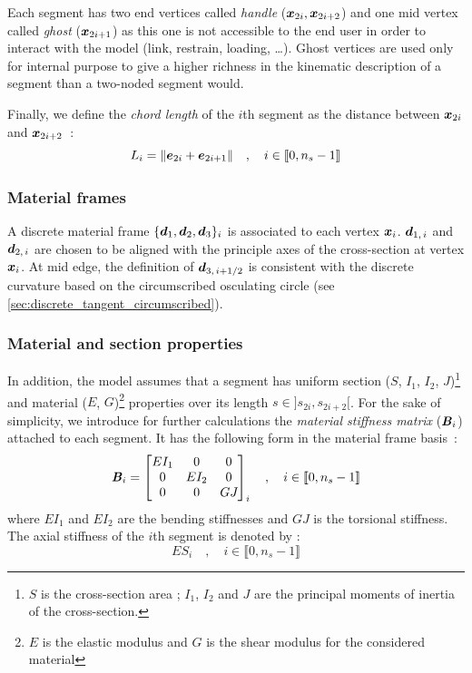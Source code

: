 Each segment has two end vertices called \emph{handle} ($\boldsymbol{x}_{2i}, \boldsymbol{x}_{2i+2}$) and one mid vertex called \emph{ghost} ($\boldsymbol{x}_{2i+1}$) as this one is not accessible to the end user in order to interact with the model (link, restrain, loading, \dots). Ghost vertices are used only for internal purpose to give a higher richness in the kinematic description of a segment than a two-noded segment would.

Finally, we define the \emph{chord length} of the $i$th segment as the distance between $\boldsymbol{x}_{2i}$ and $\boldsymbol{x}_{2i+2}$~:
\begin{equation}
	L_i = \lVert\boldsymbol{e}_{2i} + \boldsymbol{e}_{2i+1}\rVert \quad , \quad i \in \llbracket 0, n_s-1 \rrbracket
\end{equation}

\subsubsection{Material frames}
A discrete material frame $\{\boldsymbol{d}_{1}, \boldsymbol{d}_{2}, \boldsymbol{d}_{3}\}_i$ is associated to each vertex $\boldsymbol{x}_i$. $\boldsymbol{d}_{1,\,i}$ and $\boldsymbol{d}_{2,\,i}$ are chosen to be aligned with the principle axes of the cross-section at vertex $\boldsymbol{x}_i$. At mid edge, the definition of $\boldsymbol{d}_{3,\,i+1/2}$ is consistent with the discrete curvature based on the circumscribed osculating circle (see \cref{sec:discrete_tangent_circumscribed}).

\subsubsection{Material and section properties}
In addition, the model assumes that a segment has uniform section ($S$, $I_1$, $I_2$, $J$)\footnote{$S$ is the cross-section area ; $I_1$, $I_2$ and $J$ are the principal moments of inertia of the cross-section.} and material ($E$, $G$)\footnote{$E$ is the elastic modulus and $G$ is the shear  modulus for the considered material} properties over its length $s \in ]s_{2i},s_{2i+2}[$. For the sake of simplicity, we introduce for further calculations the \emph{material stiffness matrix} ($\boldsymbol{\mathit{B}}_i$) attached to each segment. It has the following form in the material frame basis~:
\begin{equation}
	\boldsymbol{\mathit{B}}_i = \begin{bmatrix} 
			EI_1		&	0		&	0		\\
			0		&	EI_{2}	&	0		\\
			0		&	0		&	GJ_{}	\\
		\end{bmatrix}_i
	\quad , \quad i \in \llbracket 0, n_s-1 \rrbracket
	\label{eq:stiffnessmatrix}
\end{equation}
where $EI_1$ and $EI_2$ are the bending stiffnesses and $GJ$ is the torsional stiffness. The axial stiffness of the $i$th segment is denoted by :
\begin{equation}
	ES_i 	\quad , \quad i \in \llbracket 0, n_s-1 \rrbracket
\end{equation}

